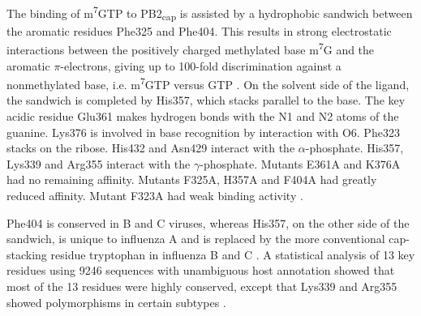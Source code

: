 The binding of m\textsuperscript{7}GTP to PB2\textsubscript{cap} is assisted by a hydrophobic sandwich between the aromatic residues Phe325 and Phe404. This results in strong electrostatic interactions between the positively charged methylated base m\textsuperscript{7}G and the aromatic $\pi$-electrons, giving up to 100-fold discrimination against a nonmethylated base, i.e. m\textsuperscript{7}GTP versus GTP \citep{1192}. On the solvent side of the ligand, the sandwich is completed by His357, which stacks parallel to the base. The key acidic residue Glu361 makes hydrogen bonds with the N1 and N2 atoms of the guanine. Lys376 is involved in base recognition by interaction with O6. Phe323 stacks on the ribose. His432 and Asn429 interact with the $\alpha$-phosphate. His357, Lys339 and Arg355 interact with the $\gamma$-phosphate. Mutants E361A and K376A had no remaining affinity. Mutants F325A, H357A and F404A had greatly reduced affinity. Mutant F323A had weak binding activity \citep{1192}.

Phe404 is conserved in B and C viruses, whereas His357, on the other side of the sandwich, is unique to influenza A and is replaced by the more conventional cap-stacking residue tryptophan in influenza B and C \citep{1192}. A statistical analysis of 13 key residues using 9246 sequences with unambiguous host annotation showed that most of the 13 residues were highly conserved, except that Lys339 and Arg355 showed polymorphisms in certain subtypes \citep{1554}.

